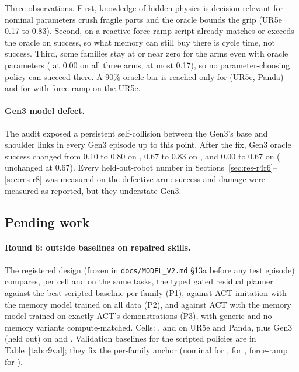 Three observations. First, knowledge of hidden physics is decision-relevant for : nominal
parameters crush fragile parts and the oracle bounds the grip (UR5e 0.17 to 0.83). Second, on
 a reactive force-ramp script already matches or exceeds the oracle on success, so what
memory can still buy there is cycle time, not success. Third, some families stay at or near zero for the
arms even with oracle parameters ( at 0.00 on all three arms,  at
most 0.17), so no parameter-choosing policy can succeed there. A 90\% oracle bar is reached only
for  (UR5e, Panda) and for  with force-ramp on the UR5e.

\paragraph{Gen3 model defect.} The audit exposed a persistent self-collision between the Gen3's base and
shoulder links in every Gen3 episode up to this point. After the fix, Gen3 oracle success changed from 0.10 to
0.80 on , 0.67 to 0.83 on , and 0.00 to 0.67 on 
( unchanged at 0.67). Every held-out-robot number in Sections~\ref{sec:res-r4r6}--\ref{sec:res-r8}
was measured on the defective arm: success and damage were measured as reported, but they understate Gen3.

\subsection{Pending work}
\label{sec:res-pending}

\paragraph{Round 6: outside baselines on repaired skills.}
The registered design (frozen in \texttt{docs/MODEL\_V2.md} \S13a before any test episode) compares, per cell and on the same tasks,
the typed gated residual planner against the best scripted baseline per family (P1), against ACT imitation with
the memory model trained on all data (P2), and against ACT with the memory model trained on exactly ACT's
demonstrations (P3), with generic and no-memory variants compute-matched. Cells: ,
 and  on UR5e and Panda, plus Gen3 (held out) on  and
. Validation baselines for the scripted policies are in Table~\ref{tab:r9val}; they fix the
per-family anchor (nominal for , \pta{} for , force-ramp for
).

